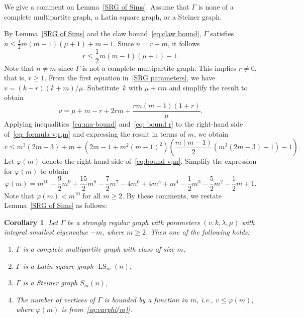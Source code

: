\documentclass[11pt]{article}
\newtheorem{coro}[theo]{Corollary}
\theoremstyle{definition}
\numberwithin{equation}{section}
\numberwithin{equation}{section}
\begin{document}
We give a comment on Lemma~\ref{SRG of Sims}.
Assume that $\Gamma$ is none of a complete multipartite graph, a Latin square graph, or a Steiner graph.


By Lemma~\ref{SRG of Sims} and the claw bound~\eqref{eq:claw bound}, $\Gamma$ satisfies $n \leqslant \frac{1}{2}m(m-1)(\mu+1) +m-1$.
Since $n=r+m$, it follows 
\begin{equation}\label{eq: bound r}
	r\leqslant \frac{1}{2} m(m-1)(\mu+1)-1.
\end{equation}
Note that $n \ne m$ since $\Gamma$ is not a complete multipartite graph.
This implies $r \ne 0$, that is, $r \geqslant 1$.
From the first equation in~\eqref{SRG parameters}, we have $v = (k-r)(k+m)/\mu$. 
Substitute~$k$ with $\mu + rm$ and simplify the result to obtain
\begin{equation}\label{eq: formula v;r,m}
	v = \mu  + m - r + 2rm + \frac{rm(m-1)(1+r)}{\mu}. 
\end{equation}
Applying inequalities~\eqref{eq:mu-bound} and~\eqref{eq: bound r} to the right-hand side of~\eqref{eq: formula v;r,m} and expressing the result in terms of $m$, we obtain
\begin{equation}\label{eq:bound v;m}
	 v \leqslant m^3(2m-3) + m + \left(2m-1+m^2(m-1)^2\right)\left(\frac{m(m-1)}{2}\left(m^3(2m-3)+1\right)-1\right).
\end{equation}
Let $\varphi(m)$ denote the right-hand side of~\eqref{eq:bound v;m}. 
Simplify the expression for $\varphi(m)$ to obtain
\begin{equation}\label{eq:varphi(m)}
	\varphi(m) =  m^{10} - \frac{9}{2}m^9 +\frac{15}{2}m^8 - \frac{7}{2}m^7 - 4m^6 +4m^5 + m^4 - \frac{1}{2}m^3 - \frac{5}{2}m^2-\frac{1}{2}m + 1.
\end{equation}
Note that $\varphi(m) < m^{10}$ for all $m\geqslant 2$.
By these comments, we restate Lemma~\ref{SRG of Sims} as follows:

\begin{coro}\label{bound on order of SRG}
Let $\Gamma$ be a strongly regular graph with parameters $(v,k,\lambda, \mu)$ with integral smallest eigenvalue $-m$, where $m\geqslant 2$. 
Then one of the following holds:
\begin{enumerate}[\normalfont(i)]
  \item $\Gamma$ is a complete multipartite graph with class of size $m$,
  \item $\Gamma$ is a Latin square graph $\operatorname{LS}_m(n)$,
  \item $\Gamma$ is a Steiner graph $S_m(n)$,
  \item The number of vertices of $\Gamma$ is bounded by a function in $m$, i.e., $v \leqslant \varphi(m)$, where $\varphi(m)$ is from~\eqref{eq:varphi(m)}.
\end{enumerate}
\end{coro}
\end{document}
